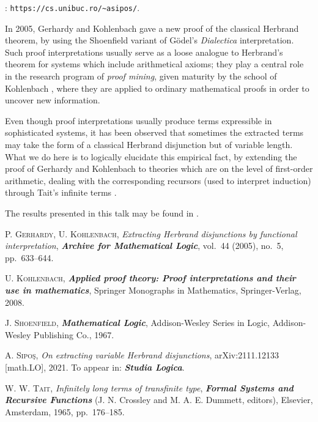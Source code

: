 \documentclass[bsl,meeting]{asl}
\def\urladdr#1{\endgraf\noindent{\it URL Address}: {\tt #1}.}
\newcommand{\NP}{}
\begin{document}
\thispagestyle{empty}


\NP  
{}
\urladdr{https://cs.unibuc.ro/\~{}asipos/}

In 2005, Gerhardy and Kohlenbach \cite{GerKoh05} gave a new proof of the classical Herbrand theorem, by using the Shoenfield variant \cite{Sho67} of G\"odel's {\it Dialectica} interpretation. Such proof interpretations usually serve as a loose analogue to Herbrand's theorem for systems which include arithmetical axioms; they play a central role in the research program of {\it proof mining}, given maturity by the school of Kohlenbach \cite{Koh08}, where they are applied to ordinary mathematical proofs in order to uncover new information.

Even though proof interpretations usually produce terms expressible in sophisticated systems, it has been observed that sometimes the extracted terms may take the form of a classical Herbrand disjunction but of variable length. What we do here is to logically elucidate this empirical fact, by extending the proof of Gerhardy and Kohlenbach to theories which are on the level of first-order arithmetic, dealing with the corresponding recursors (used to interpret induction) through Tait's infinite terms \cite{Tai65}.

The results presented in this talk may be found in \cite{SipXX}.

\begin{thebibliography}{20}
{\scshape P. Gerhardy, U. Kohlenbach},
{\itshape Extracting Herbrand disjunctions by functional interpretation},
{\bfseries\itshape Archive for Mathematical Logic},
vol.~44 (2005), no.~5, pp.~633--644.

{\scshape U. Kohlenbach},
{\bfseries\itshape Applied proof theory: Proof interpretations and their use in mathematics},
Springer Monographs in Mathematics,
Springer-Verlag,
2008.

{\scshape J. Shoenfield},
{\bfseries\itshape  Mathematical Logic},
Addison-Wesley Series in Logic,
Addison-Wesley Publishing Co.,
1967.

{\scshape A. Sipo\c s},
{\itshape On extracting variable Herbrand disjunctions},
arXiv:2111.12133 [math.LO], 2021. To appear in: {\bfseries\itshape Studia Logica}.

{\scshape W. W. Tait},
{\itshape Infinitely long terms of transfinite type},
{\bfseries\itshape Formal Systems and Recursive Functions}
(J. N. Crossley and M. A. E. Dummett, editors),
Elsevier,
Amsterdam,
1965,
pp.~176--185.
\end{thebibliography}


\vspace*{-0.5\baselineskip}
\end{document}
